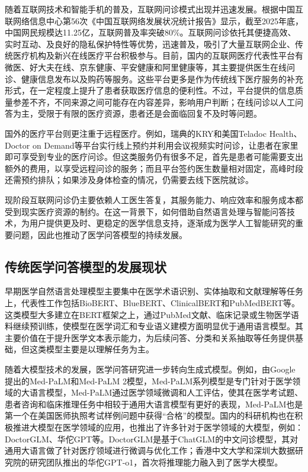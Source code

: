 随着互联网技术和智能手机的普及，互联网问诊模式出现并迅速发展。根据中国互联网络信息中心第56次《中国互联网络发展状况统计报告》显示，截至2025年底，中国网民规模达11.25亿，互联网普及率突破80\%\cite{CNNICReport56_2025}。互联网问诊依托其便捷高效、实时互动、及良好的隐私保护特性等优势，迅速普及，吸引了大量互联网企业、传统医疗机构及新兴在线医疗平台积极参与\cite{WSGL201702004}。目前，国内的互联网医疗代表性平台有微医、好大夫在线、京东健康、平安健康和阿里健康等，其主要提供医生在线问诊、健康信息发布以及购药等服务。这些平台更多是作为传统线下医疗服务的补充形式，在一定程度上提升了患者获取医疗信息的便利性。不过，平台提供的信息质量参差不齐，不同来源之间可能存在内容差异，影响用户判断；在线问诊以人工问答为主，受限于有限的医疗资源，患者还是会面临回复不及时等问题。

国外的医疗平台则更注重于远程医疗。例如，瑞典的KRY和美国Teladoc Health、Doctor on Demand等平台实行线上预约并利用会议视频实时问诊，让患者在家里即可享受到专业的医疗问诊\cite{WRKX201206003}。但这类服务仍有很多不足，首先是患者可能需要支出额外的费用，以享受远程问诊的服务；而且平台签约医生数量相对固定，高峰时段还需预约排队；如果涉及身体检查的情况，仍需要去线下医院就诊。

现阶段互联网问诊仍主要依赖人工医生答复，其服务能力、响应效率和服务成本都受到现实医疗资源的制约。在这一背景下，如何借助自然语言处理与智能问答技术，为用户提供更及时、更稳定的医学信息支持，逐渐成为医学人工智能研究的重要问题，因此也推动了医学问答模型的持续发展。

\subsection{传统医学问答模型的发展现状}

早期医学自然语言处理模型主要集中在医学术语识别、实体抽取和文献理解等任务上，代表性工作包括BioBERT、BlueBERT、ClinicalBERT和PubMedBERT等。这类模型大多建立在BERT框架之上，通过PubMed文献、临床记录或生物医学语料继续预训练，使模型在医学词汇和专业语义建模方面明显优于通用语言模型。其主要价值在于提升医学文本表示能力，为后续问答、分类和关系抽取等任务提供基础，但这类模型主要是以理解任务为主。

随着大模型技术的发展，医学问答研究进一步转向生成式模型。例如，由Google提出的Med-PaLM和Med-PaLM 2模型，Med-PaLM系列模型是专门针对于医学领域的大语言模型，Med-PaLM通过医学领域微调和人工评估，使其在医学考试题、患者咨询和临床推理任务中相较于通用大语言模型有更好的表现，Med-PaLM也是第一个在美国医师执照考试样例问题中获得“合格”的模型\cite{Singhal_2025}。国内的科研机构也在积极推进大模型在医学领域的应用，也推出了许多针对于医学领域的大模型，例如：DoctorGLM、华佗GPT等。DoctorGLM是基于ChatGLM的中文问诊模型，其对通用大语言做了针对医疗领域进行微调与优化工作；香港中文大学和深圳大数据研究院的研究团队推出的华佗GPT-o1，首次将推理能力融入到了医学大模型。

